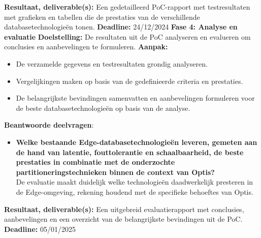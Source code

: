     \textbf{Resultaat, deliverable(s):} Een gedetailleerd PoC-rapport met testresultaten met grafieken en tabellen die de prestaties van de verschillende databasetechnologieën tonen.\newline\newline
    \textbf{Deadline:} 24/12/2024\newline\newline
\textbf{Fase 4: Analyse en evaluatie}\newline\newline
    \textbf{Doelstelling:} De resultaten uit de PoC analyseren en evalueren om conclusies en aanbevelingen te formuleren.\newline\newline
    \textbf{Aanpak:}
    \begin{itemize}
        \item De verzamelde gegevens en testresultaten grondig analyseren.
        \item Vergelijkingen maken op basis van de gedefinieerde criteria en prestaties.
        \item De belangrijkste bevindingen samenvatten en aanbevelingen formuleren voor de beste databasetechnologieën op basis van de analyse.\newline
    \end{itemize}
    \textbf{Beantwoorde deelvragen}:
    \begin{itemize}
    \item \textbf{Welke bestaande Edge-databasetechnologieën leveren, gemeten aan de hand van latentie, fouttolerantie en schaalbaarheid, de beste prestaties in combinatie met de onderzochte partitioneringstechnieken binnen de context van Optis?} \\
      De evaluatie maakt duidelijk welke technologieën daadwerkelijk presteren in de Edge-omgeving, rekening houdend met de specifieke behoeftes van Optis.
    \end{itemize}
    \textbf{Resultaat, deliverable(s):} Een uitgebreid evaluatierapport met conclusies, aanbevelingen en een overzicht van de belangrijkste bevindingen uit de PoC.\newline\newline
    \textbf{Deadline:} 05/01/2025\newline\newline

